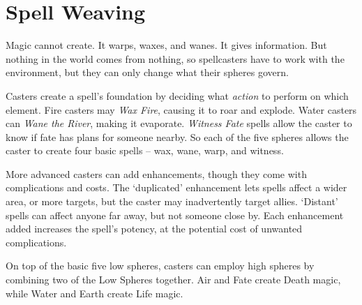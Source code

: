 \chapter{Spell Weaving}

Magic cannot create.
It warps, waxes, and wanes.
It gives information.
But nothing in the world comes from nothing, so spellcasters have to work with the environment, but they can only change what their spheres govern.

Casters create a spell's foundation by deciding what \emph{action} to perform on which element.
Fire casters may \textit{Wax Fire}, causing it to roar and explode.
Water casters can \textit{Wane the River}, making it evaporate.
\textit{Witness Fate} spells allow the caster to know if fate has plans for someone nearby.
So each of the five spheres allows the caster to create four basic spells -- wax, wane, warp, and witness.

More advanced casters can add enhancements, though they come with complications and costs.
The `duplicated' enhancement lets spells affect a wider area, or more targets, but the caster may inadvertently target allies.
`Distant' spells can affect anyone far away, but not someone close by.
Each enhancement added increases the spell's potency, at the potential cost of unwanted complications.

On top of the basic five low spheres, casters can employ high spheres by combining two of the Low Spheres together.
Air and Fate create Death magic, while Water and Earth create Life magic.

\vspace{2em}
\newlength{\magicCircle}
\setlength{\magicCircle}{.32\textwidth}
\newlength{\sphereBack}
\setlength{\sphereBack}{18pt}

